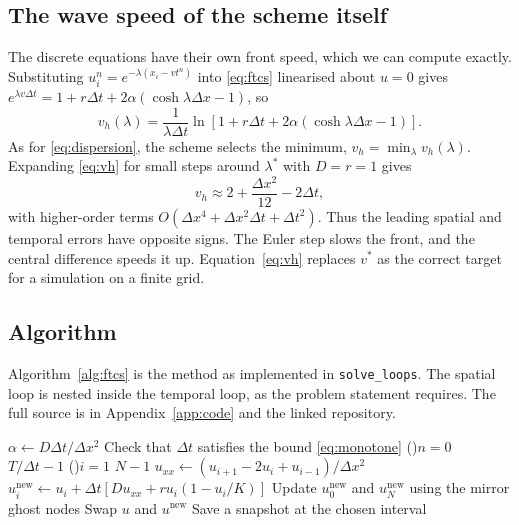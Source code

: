 \documentclass[11pt,a4paper]{article}
\newcommand{\code}[1]{\texttt{\small #1}}
\begin{document}
\subsection{The wave speed of the scheme itself}\label{sec:discretespeed}
The discrete equations have their own front speed, which we can compute exactly. Substituting
$u_i^n=e^{-\lambda(x_i-vt^n)}$ into \eqref{eq:ftcs} linearised about $u=0$ gives
$e^{\lambda v\Delta t}=1+r\Delta t+2\alpha\left(\cosh\lambda\Delta x-1\right)$, so
\begin{equation}
  v_h(\lambda)=\frac{1}{\lambda\Delta t}\ln\!\left[1+r\Delta t+2\alpha\left(\cosh\lambda\Delta x-1\right)\right].
  \label{eq:vh}
\end{equation}
As for \eqref{eq:dispersion}, the scheme selects the minimum, $v_h=\min_\lambda v_h(\lambda)$. Expanding
\eqref{eq:vh} for small steps around $\lambda^*$ with $D=r=1$ gives
\begin{equation}
  v_h\approx 2+\frac{\Delta x^2}{12}-2\Delta t ,
  \label{eq:vhapprox}
\end{equation}
with higher-order terms $O(\Delta x^4+\Delta x^2\Delta t+\Delta t^2)$. Thus the leading spatial and temporal errors have opposite signs. The Euler step slows the front,
and the central difference speeds it up. Equation~\eqref{eq:vh} replaces $v^*$ as the correct target
for a simulation on a finite grid.

\subsection{Algorithm}
Algorithm~\ref{alg:ftcs} is the method as implemented in \code{solve\_loops}. The spatial loop
is nested inside the temporal loop, as the problem statement requires. The full source is in Appendix~\ref{app:code} and the linked repository.

\begin{algorithm}[H]
\caption{Explicit finite difference solver for the Fisher-KPP equation}
\label{alg:ftcs}
$\alpha\leftarrow D\Delta t/\Delta x^2$\;
Check that $\Delta t$ satisfies the bound \eqref{eq:monotone}\;
\For(){$n=0$ \KwTo $T/\Delta t-1$}{
  \For(){$i=1$ \KwTo $N-1$}{
    $u_{xx}\leftarrow(u_{i+1}-2u_i+u_{i-1})/\Delta x^2$\;
    $u_i^{\mbox{new}}\leftarrow u_i+\Delta t\left[Du_{xx}+ru_i(1-u_i/K)\right]$\;
  }
  Update $u_0^{\mbox{new}}$ and $u_N^{\mbox{new}}$ using the mirror ghost nodes\;
  Swap $u$ and $u^{\mbox{new}}$\;
  Save a snapshot at the chosen interval\;
}
\end{algorithm}
\end{document}
